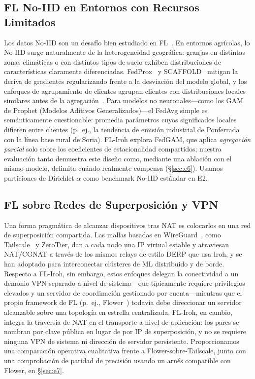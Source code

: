\documentclass[journal]{IEEEtran}
\begin{document}
\subsection{FL No-IID en Entornos con Recursos Limitados}

Los datos No-IID son un desafío bien estudiado en FL~\cite{zhao2018noniid,li2022noniid,kairouz2021}. En entornos agrícolas, lo No-IID surge naturalmente de la heterogeneidad geográfica: granjas en distintas zonas climáticas o con distintos tipos de suelo exhiben distribuciones de características claramente diferenciadas. FedProx~\cite{fedprox2020} y SCAFFOLD~\cite{scaffold2020} mitigan la deriva de gradientes regularizando frente a la desviación del modelo global, y los enfoques de agrupamiento de clientes agrupan clientes con distribuciones locales similares antes de la agregación~\cite{briggs2020cluster}. Para modelos no neuronales---como los GAM de Prophet (Modelos Aditivos Generalizados)---el FedAvg simple es semánticamente cuestionable: promedia parámetros cuyos significados locales difieren entre clientes (p.~ej., la tendencia de emisión industrial de Ponferrada con la línea base rural de Soria). FL-Iroh explora FedGAM, que aplica \emph{agregación parcial} solo sobre los coeficientes de estacionalidad compartidos; nuestra evaluación tanto demuestra este diseño como, mediante una ablación con el mismo modelo, delimita cuándo realmente compensa (\S\ref{sec:e6}). Usamos particiones de Dirichlet $\alpha$ como benchmark No-IID estándar en E2.

\subsection{FL sobre Redes de Superposición y VPN}

Una forma pragmática de alcanzar dispositivos tras NAT es colocarlos en una red de superposición compartida. Las mallas basadas en WireGuard~\cite{wireguard2017}, como Tailscale~\cite{tailscale2023} y ZeroTier, dan a cada nodo una IP virtual estable y atraviesan NAT/CGNAT a través de los mismos relays de estilo DERP que usa Iroh, y se han adoptado para interconectar clústeres de ML distribuido y de borde. Respecto a FL-Iroh, sin embargo, estos enfoques delegan la conectividad a un demonio VPN separado a nivel de sistema---que típicamente requiere privilegios elevados y un servidor de coordinación gestionado por cuenta---mientras que el propio framework de FL (p.~ej., Flower~\cite{flower2022}) todavía debe direccionar un servidor alcanzable sobre una topología en estrella centralizada. FL-Iroh, en cambio, integra la traversía de NAT en el transporte a nivel de aplicación: los pares se nombran por clave pública en lugar de por IP de superposición, y no se requiere ninguna VPN de sistema ni dirección de servidor persistente. Proporcionamos una comparación operativa cualitativa frente a Flower-sobre-Tailscale, junto con una comprobación de paridad de precisión usando un arnés compatible con Flower, en \S\ref{sec:e7}.
\end{document}
